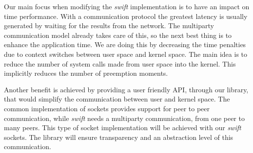 
Our main focus when modifying the \emph{swift} implementation is to have an impact on time performance. With a
communication
protocol the greatest latency is usually generated by waiting for the results from the network. The multiparty
communication model already takes care of this, so the next best thing is to enhance the application time. We are doing
this by decreasing the time penalties due to context switches between user space and kernel space. The main idea is to
reduce the number of system calls made from user space into the kernel. This implicitly reduces the number of
preemption moments.

Another benefit is achieved by providing a user friendly API, through our library, that would simplify the
communication between user and kernel space. The common implementation of sockets provides support for peer to peer
communication, while \emph{swift} needs a multiparty communication, from one peer to many peers. This type of socket
implementation will be achieved with our \emph{swift} sockets. The library will ensure transparency and an abstraction
level of this communication.